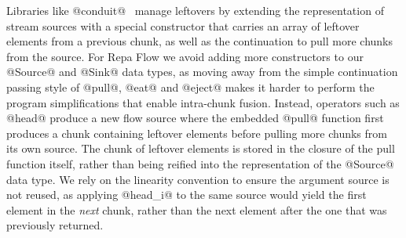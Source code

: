 Libraries like @conduit@~\cite{hackage:conduit} manage leftovers by extending the representation of stream sources with a special constructor that carries an array of leftover elements from a previous chunk, as well as the continuation to pull more chunks from the source. For Repa Flow we avoid adding more constructors to our @Source@ and @Sink@ data types, as moving away from the simple continuation passing style of @pull@, @eat@ and @eject@ makes it harder to perform the program simplifications that enable intra-chunk fusion. Instead, operators such as @head@ produce a new flow source where the embedded @pull@ function first produces a chunk containing leftover elements before pulling more chunks from its own source. The chunk of leftover elements is stored in the closure of the pull function itself, rather than being reified into the representation of the @Source@ data type. We rely on the linearity convention to ensure the argument source is not reused, as applying @head_i@ to the same source would yield the first element in the \emph{next} chunk, rather than the next element after the one that was previously returned.

